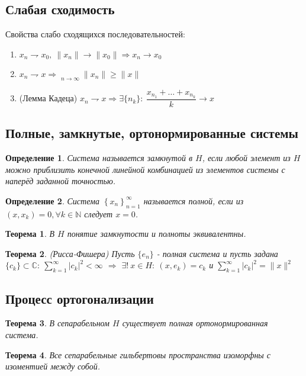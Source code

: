 \documentclass[9pt, a4paper]{extarticle}
\newtheorem{theorem}{Теорема}
\newtheorem{definition}{Определение}
\DeclareMathOperator*\lowlim{\underline{lim}}
\numberwithin{equation}{section}
\numberwithin{lemma}{section}
\numberwithin{definition}{section}
\numberwithin{notabene}{section}
\numberwithin{corollary}{section}
\begin{document}
	\subsection{Слабая сходимость}
		Свойства слабо сходящихся последовательностей:
		\begin{enumerate}
			\item $x_n \rightharpoondown x_0 , \ \|x_n\| \to \|x_0\| \Rightarrow x_n \to x_0$
			\item $x_n \rightharpoondown x \Rightarrow  \lowlim\limits_{n\to\infty} \|x_n\| \geq \|x\|$
			\item (Лемма Кадеца) $x_n \rightharpoondown x \Rightarrow \exists \{n_k\}: \ \dfrac{x_{n_1} + \dots + x_{n_k}}{k} \to x$
		\end{enumerate}
	\subsection{Полные, замкнутые, ортонормированные системы}
		\begin{definition}
			Система называется замкнутой в $H$, если любой элемент из $H$ можно приблизить конечной линейной комбинацией из элементов системы с наперёд заданной точностью.
		\end{definition}
		\begin{definition}
			Система $\left\{x_n\right\}_{n=1}^{\infty}$ называется полной, если из $(x,x_k) = 0, \forall k \in \mathbb{N}$ следует $x = 0$. 
		\end{definition}
		\begin{theorem}
			В $H$ понятие замкнутости и полноты эквивалентны.		
		\end{theorem}
		\begin{theorem}
				(Рисса-Фишера)\newline
				Пусть $\{e_n\}$ - полная система и пусть задана $\{c_k\} \subset \mathbb{C}: \ \sum\limits_{k=1}^{\infty} |c_k|^2 < \infty$ $\Rightarrow$  $\exists! \ x\in H : \ (x,e_k) = c_k$ и $\sum\limits_{k=1}^{\infty} |c_k|^2 = \|x\|^2$
		\end{theorem}
		\subsection{Процесс ортогонализации}
		\begin{theorem}
			В сепарабельном $H$ существует полная ортонормированная система.			
		\end{theorem}
		\begin{theorem}
			Все сепарабельные гильбертовы пространства изоморфны с изоментией между собой. 
		\end{theorem}
\end{document}
